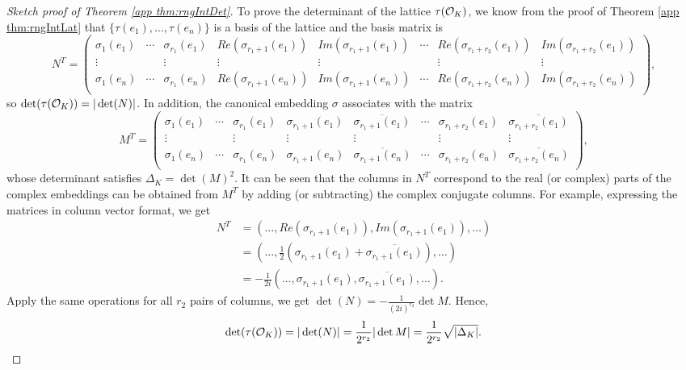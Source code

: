 \documentclass[../main.tex]{subfiles}
\begin{document}
\begin{proof}[Sketch proof of Theorem \ref{app thm:rngIntDet}]
To prove the determinant of the lattice $\tau(\mathcal{O}_K)$, we know from the proof of Theorem \ref{app thm:rngIntLat} that $\{\tau(e_1),\dots,\tau(e_n)\}$ is a basis of the lattice and the basis matrix is 
\begin{equation*}
N^T = \left(
\begin{smallmatrix}
\sigma_1(e_1) & \cdots & \sigma_{r_1}(e_1) & Re(\sigma_{r_1+1}(e_1)) & Im(\sigma_{r_1+1}(e_1)) & \cdots & Re(\sigma_{r_1+r_2}(e_1)) & Im(\sigma_{r_1+r_2}(e_1)) \\
\vdots & & \vdots & \vdots & \vdots & & \vdots & \vdots \\
\sigma_1(e_n) & \cdots & \sigma_{r_1}(e_n) & Re(\sigma_{r_1+1}(e_n)) & Im(\sigma_{r_1+1}(e_n)) & \cdots & Re(\sigma_{r_1+r_2}(e_n)) & Im(\sigma_{r_1+r_2}(e_n)) \\
\end{smallmatrix}
\right),
\end{equation*}
so $\det(\tau(\mathcal{O}_K))=|\det(N)|$. In addition, the canonical embedding $\sigma$ associates with the matrix 
\begin{equation*}
M^T = \left(
\begin{smallmatrix}
\sigma_1(e_1) & \cdots & \sigma_{r_1}(e_1) & \sigma_{r_1+1}(e_1) & \overline{\sigma_{r_1+1}(e_1)} & \cdots & \sigma_{r_1+r_2}(e_1) & \overline{\sigma_{r_1+r_2}(e_1)} \\
\vdots & & \vdots & \vdots & \vdots & & \vdots & \vdots \\
\sigma_1(e_n) & \cdots & \sigma_{r_1}(e_n) & \sigma_{r_1+1}(e_n) & \overline{\sigma_{r_1+1}(e_n)} & \cdots & \sigma_{r_1+r_2}(e_n) & \overline{\sigma_{r_1+r_2}(e_n)} \\
\end{smallmatrix}
\right),
\end{equation*}
whose determinant satisfies $\Delta_K=\det(M)^2$. It can be seen that the columns in $N^T$ correspond to the real (or complex) parts of the complex embeddings can be obtained from $M^T$ by adding (or subtracting) the complex conjugate columns. For example, expressing the matrices in column vector format, we get 
\begin{align*}
    N^T &= (\dots, Re(\sigma_{r_1+1}(e_1)), Im(\sigma_{r_1+1}(e_1)), \dots) \\
    &= (\dots, \frac{1}{2}(\sigma_{r_1+1}(e_1)+\overline{\sigma_{r_1+1}(e_1)}), \dots)\\
    &=-\frac{1}{2i}(\dots, \sigma_{r_1+1}(e_1),\overline{\sigma_{r_1+1}(e_1)}, \dots).
\end{align*}
Apply the same operations for all $r_2$ pairs of columns, we get $\det (N) = -\frac{1}{(2i)^{r_2}} \det M$. Hence, 
\begin{equation*}
    \det(\tau(\mathcal{O}_K)) = |\det (N)| = \frac{1}{2^{r_2}} |\det M|=\frac{1}{2^{r_2}}\sqrt{|\Delta_K|}. 
\end{equation*}
\end{proof}
\end{document}
